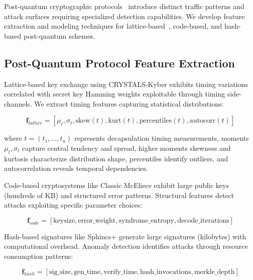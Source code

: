Post-quantum cryptographic protocols~\cite{bernstein2017post,alagic2020nist} introduce distinct traffic patterns and attack surfaces requiring specialized detection capabilities. We develop feature extraction and modeling techniques for lattice-based~\cite{avanzi2019crystals}, code-based, and hash-based post-quantum schemes.



\subsection{Post-Quantum Protocol Feature Extraction}

Lattice-based key exchange using CRYSTALS-Kyber exhibits timing variations correlated with secret key Hamming weights exploitable through timing side-channels. We extract timing features capturing statistical distributions:

\begin{equation}
\mathbf{f}_{lattice} = [\mu_t, \sigma_t, \text{skew}(t), \text{kurt}(t), \text{percentiles}(t), \text{autocorr}(t)]
\end{equation}

where $t = (t_1, \ldots, t_n)$ represents decapsulation timing measurements, moments $\mu_t, \sigma_t$ capture central tendency and spread, higher moments skewness and kurtosis characterize distribution shape, percentiles identify outliers, and autocorrelation reveals temporal dependencies.

Code-based cryptosystems like Classic McEliece exhibit large public keys (hundreds of KB) and structured error patterns. Structural features detect attacks exploiting specific parameter choices:

\begin{equation}
\mathbf{f}_{code} = [\text{keysize}, \text{error\_weight}, \text{syndrome\_entropy}, \text{decode\_iterations}]
\end{equation}

Hash-based signatures like Sphincs+ generate large signatures (kilobytes) with computational overhead. Anomaly detection identifies attacks through resource consumption patterns:

\begin{equation}
\mathbf{f}_{hash} = [\text{sig\_size}, \text{gen\_time}, \text{verify\_time}, \text{hash\_invocations}, \text{merkle\_depth}]
\end{equation}

